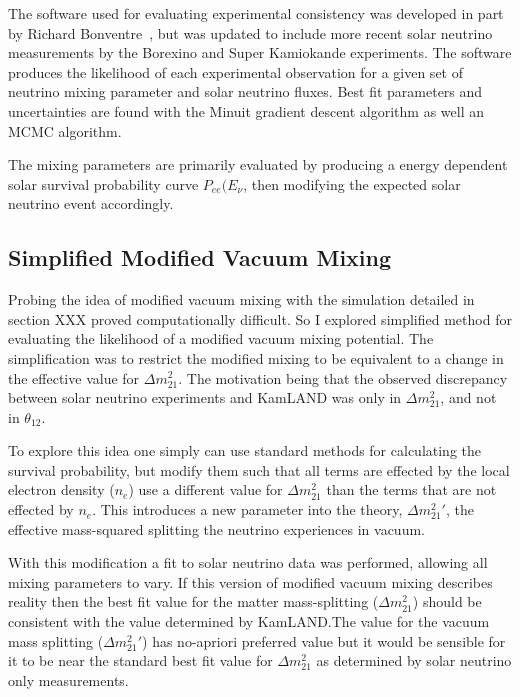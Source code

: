 The software used for evaluating experimental consistency was developed
in part by Richard Bonventre~\citep{richie_thesis, richie_nsi},
but was updated to include more recent solar neutrino measurements
by the Borexino and Super Kamiokande experiments.
The software produces the likelihood of each experimental observation
for a given set of neutrino mixing parameter and solar neutrino fluxes.
Best fit parameters and uncertainties are found with the Minuit gradient
descent algorithm as well an MCMC algorithm. %

The mixing parameters are primarily evaluated by producing a energy dependent
solar survival probability curve $P_{ee}(E_{\nu}$, then modifying the expected
solar neutrino event accordingly. %


\subsection{Simplified Modified Vacuum Mixing}
Probing the idea of modified vacuum mixing with the simulation detailed in
section XXX proved computationally difficult.
So I explored simplified method for evaluating the likelihood of a modified
vacuum mixing potential. The simplification was to restrict the modified mixing
to be equivalent to a change in the effective value for $\Delta m^{2}_{21}$.
The motivation being that the observed discrepancy between solar neutrino
experiments and KamLAND was only in $\Delta m^{2}_{21}$, and not in $\theta_{12}$.

To explore this idea one simply can use standard methods for calculating the
survival probability, but modify them such that all terms are effected by the
local electron density ($n_{e}$) use a different value for $\Delta m^{2}_{21}$ than the
terms that are not effected by $n_{e}$.
This introduces a new parameter into the theory, $\Delta m^{2}_{21}\prime$, the
effective mass-squared splitting the neutrino experiences in vacuum.

With this modification a fit to solar neutrino data was performed, allowing
all mixing parameters to vary. If this version of modified vacuum mixing describes
reality then the best fit value for the matter mass-splitting ($\Delta m^{2}_{21}$) should be
consistent with the value determined by KamLAND.\@ The value for the vacuum mass
splitting ($\Delta m^{2}_{21}\prime$) has no-apriori preferred value but it would
be sensible for it to be near the standard best fit value for $\Delta m^{2}_{21}$
as determined by solar neutrino only measurements.

